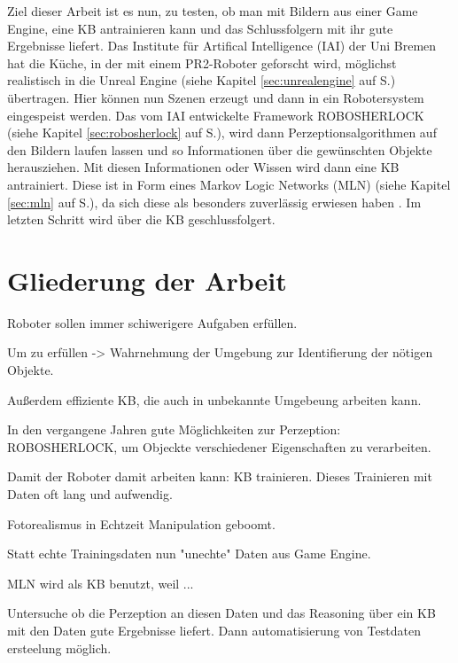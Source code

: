 Ziel dieser Arbeit ist es nun, zu testen, ob man mit Bildern aus einer Game Engine, eine KB antrainieren kann und das Schlussfolgern mit ihr gute Ergebnisse liefert. Das Institute für Artifical Intelligence (IAI) der Uni Bremen hat die Küche, in der mit einem PR2-Roboter geforscht wird, möglichst realistisch in die Unreal Engine (siehe Kapitel \ref{sec:unrealengine} auf S.\pageref{sec:unrealengine}) übertragen. Hier können nun Szenen erzeugt und dann in ein Robotersystem eingespeist werden. Das vom IAI entwickelte Framework ROBOSHERLOCK (siehe Kapitel \ref{sec:robosherlock} auf S.\pageref{sec:robosherlock}), wird dann Perzeptionsalgorithmen auf den Bildern laufen lassen und so Informationen über die gewünschten Objekte herausziehen. Mit diesen Informationen oder Wissen wird dann eine KB antrainiert. Diese ist in Form eines Markov Logic Networks (MLN) (siehe Kapitel \ref{sec:mln} auf S.\pageref{sec:mln}), da sich diese als besonders zuverlässig erwiesen haben . Im letzten Schritt wird über die KB geschlussfolgert.    


\section{Gliederung der Arbeit}
\label{sec:gliederung}



Roboter sollen immer schiwerigere Aufgaben erfüllen.

Um zu erfüllen -> Wahrnehmung der Umgebung zur Identifierung der nötigen Objekte.

Außerdem effiziente KB, die auch in unbekannte Umgebeung arbeiten kann. \par

In den vergangene Jahren gute Möglichkeiten zur Perzeption: ROBOSHERLOCK, um Objeckte verschiedener Eigenschaften zu verarbeiten.

Damit der Roboter damit arbeiten kann: KB trainieren.
Dieses Trainieren mit Daten oft lang und aufwendig.

Fotorealismus in Echtzeit Manipulation geboomt.

Statt echte Trainingsdaten nun "unechte" Daten aus Game Engine.

MLN wird als KB benutzt, weil ...

Untersuche ob die Perzeption an diesen Daten und das Reasoning über ein KB mit den Daten gute Ergebnisse liefert. Dann automatisierung von Testdaten ersteelung möglich. 
   

